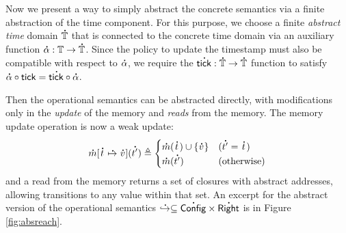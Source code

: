 \documentclass[acmsmall,screen,review]{acmart}\settopmatter{printfolios=true,printccs=false,printacmref=false}
\newcommand*{\A}[1]{\overset{\,_{\mbox{\Large .}}}{#1}}
\newcommand*{\Time}{\mathbb{T}}
\newcommand*{\mem}{m}
\newcommand*{\Config}{\mathsf{Config}}
\newcommand*{\Right}{\mathsf{Right}}
\newcommand*{\semarrow}{\hookrightarrow}
\newcommand*{\tick}{\mathsf{tick}}
\begin{document}
Now we present a way to simply abstract the concrete semantics via a finite abstraction of the time component.
For this purpose, we choose a finite \emph{abstract time} domain $\A\Time$ that is connected to the concrete time domain via an auxiliary function $\A\alpha:\Time\rightarrow\A\Time$.
Since the policy to update the timestamp must also be compatible with respect to $\A\alpha$, we require the $\A\tick:\A\Time\rightarrow\A\Time$ function to satisfy $\A\alpha\circ\tick=\A\tick\circ\A\alpha$.

Then the operational semantics can be abstracted directly, with modifications only in the \emph{update} of the memory and \emph{reads} from the memory.
The memory update operation is now a weak update:
\[
  \A{\mem}[\A{t}\A{\mapsto}\A{v}](\A{t'})\triangleq
  \begin{cases}
    \A{\mem}(\A{t})\cup\{\A{v}\} & (\A{t'}=\A{t})     \\
    \A{\mem}(\A{t'})             & (\text{otherwise})
  \end{cases}
\]
and a read from the memory returns a set of closures with abstract addresses, allowing transitions to any value within that set.
An excerpt for the abstract version of the operational semantics $\A\semarrow\subseteq\A{\Config}\times\A{\Right}$ is in Figure \ref{fig:absreach}.
\end{document}
